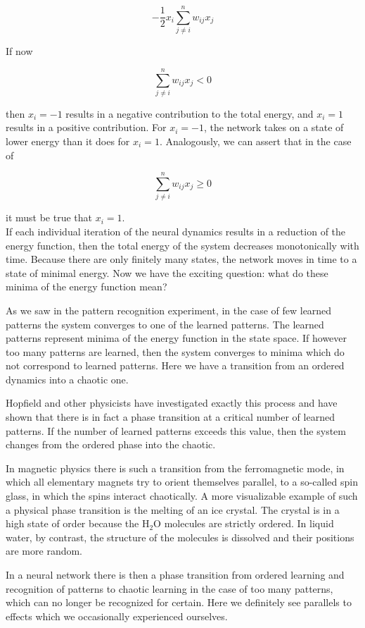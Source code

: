 \documentclass[10pt]{book}
\begin{document}
$$
-\frac{1}{2} x_{i} \sum_{j \neq i}^{n} w_{i j} x_{j}
$$

If now

$$
\sum_{j \neq i}^{n} w_{i j} x_{j}<0
$$

then $x_{i}=-1$ results in a negative contribution to the total energy, and $x_{i}=1$ results in a positive contribution. For $x_{i}=-1$, the network takes on a state of lower energy than it does for $x_{i}=1$. Analogously, we can assert that in the case of

$$
\sum_{j \neq i}^{n} w_{i j} x_{j} \geq 0
$$

it must be true that $x_{i}=1$.\\
If each individual iteration of the neural dynamics results in a reduction of the energy function, then the total energy of the system decreases monotonically with time. Because there are only finitely many states, the network moves in time to a state of minimal energy. Now we have the exciting question: what do these minima of the energy function mean?

As we saw in the pattern recognition experiment, in the case of few learned patterns the system converges to one of the learned patterns. The learned patterns represent minima of the energy function in the state space. If however too many patterns are learned, then the system converges to minima which do not correspond to learned patterns. Here we have a transition from an ordered dynamics into a chaotic one.

Hopfield and other physicists have investigated exactly this process and have shown that there is in fact a phase transition at a critical number of learned patterns. If the number of learned patterns exceeds this value, then the system changes from the ordered phase into the chaotic.

In magnetic physics there is such a transition from the ferromagnetic mode, in which all elementary magnets try to orient themselves parallel, to a so-called spin glass, in which the spins interact chaotically. A more visualizable example of such a physical phase transition is the melting of an ice crystal. The crystal is in a high state of order because the $\mathrm{H}_{2} \mathrm{O}$ molecules are strictly ordered. In liquid water, by contrast, the structure of the molecules is dissolved and their positions are more random.

In a neural network there is then a phase transition from ordered learning and recognition of patterns to chaotic learning in the case of too many patterns, which can no longer be recognized for certain. Here we definitely see parallels to effects which we occasionally experienced ourselves.
\end{document}
